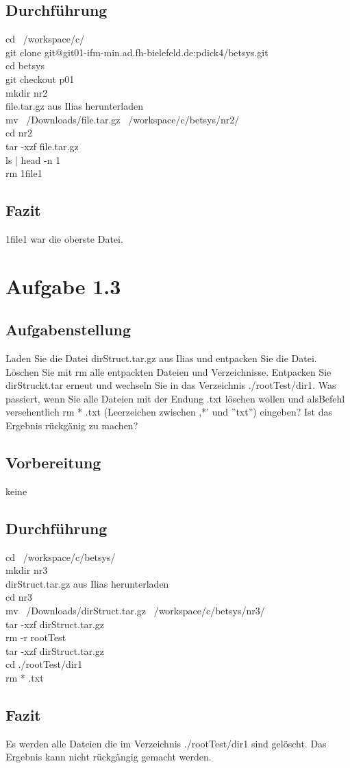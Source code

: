 	\subsection{Durchführung}
		cd ~/workspace/c/\\
		git clone git@git01-ifm-min.ad.fh-bielefeld.de:pdick4/betsys.git\\
		cd betsys\\
		git checkout p01\\
		mkdir nr2\\
		file.tar.gz aus Ilias herunterladen\\
		mv ~/Downloads/file.tar.gz ~/workspace/c/betsys/nr2/\\
		cd nr2\\
		tar -xzf file.tar.gz\\
		ls | head -n 1\\
		rm 1file1\\
	\subsection{Fazit}
		1file1 war die oberste Datei.
\newpage
\section{Aufgabe 1.3}
\subsection{Aufgabenstellung}
	Laden Sie die Datei dirStruct.tar.gz aus Ilias und entpacken Sie die Datei. L\"oschen Sie mit rm alle entpackten Dateien und Verzeichnisse. Entpacken Sie dirStruckt.tar erneut und wechseln Sie in das Verzeichnis ./rootTest/dir1. Was passiert, wenn Sie alle Dateien mit der Endung .txt l\"oschen wollen und alsBefehl versehentlich rm * .txt (Leerzeichen zwischen ,*' und ''txt'') eingeben? Ist das Ergebnis r\"uckg\"anig zu machen?
\subsection{Vorbereitung}
	keine
\subsection{Durchführung}
	cd ~/workspace/c/betsys/\\
	mkdir nr3\\
	dirStruct.tar.gz aus Ilias herunterladen\\
	cd nr3\\
	mv ~/Downloads/dirStruct.tar.gz ~/workspace/c/betsys/nr3/\\
	tar -xzf dirStruct.tar.gz\\
	rm -r rootTest\\
	tar -xzf dirStruct.tar.gz\\
	cd ./rootTest/dir1\\
	rm * .txt\\
\subsection{Fazit}
	Es werden alle Dateien die im Verzeichnis ./rootTest/dir1 sind gel\"oscht. Das Ergebnis kann nicht r\"uckg\"angig gemacht werden.
